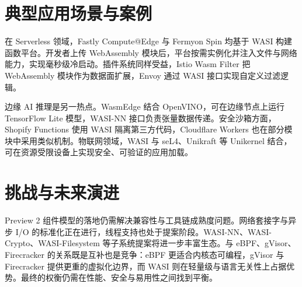 \chapter{典型应用场景与案例}
在 Serverless 领域，Fastly Compute@Edge 与 Fermyon Spin 均基于 WASI 构建函数平台。开发者上传 WebAssembly 模块后，平台按需实例化并注入文件与网络能力，实现毫秒级冷启动。插件系统同样受益，Istio Wasm Filter 把 WebAssembly 模块作为数据面扩展，Envoy 通过 WASI 接口实现自定义过滤逻辑。\par
边缘 AI 推理是另一热点。WasmEdge 结合 OpenVINO，可在边缘节点上运行 TensorFlow Lite 模型，WASI-NN 接口负责张量数据传递。安全沙箱方面，Shopify Functions 使用 WASI 隔离第三方代码，Cloudflare Workers 也在部分模块中采用类似机制。物联网领域，WASI 与 seL4、Unikraft 等 Unikernel 结合，可在资源受限设备上实现安全、可验证的应用加载。\par
\chapter{挑战与未来演进}
Preview 2 组件模型的落地仍需解决兼容性与工具链成熟度问题。网络套接字与异步 I/O 的标准化正在进行，线程支持也处于提案阶段。WASI-NN、WASI-Crypto、WASI-Filesystem 等子系统提案将进一步丰富生态。与 eBPF、gVisor、Firecracker 的关系既是互补也是竞争：eBPF 更适合内核态可编程，gVisor 与 Firecracker 提供更重的虚拟化边界，而 WASI 则在轻量级与语言无关性上占据优势。最终的权衡仍需在性能、安全与易用性之间找到平衡。\par
